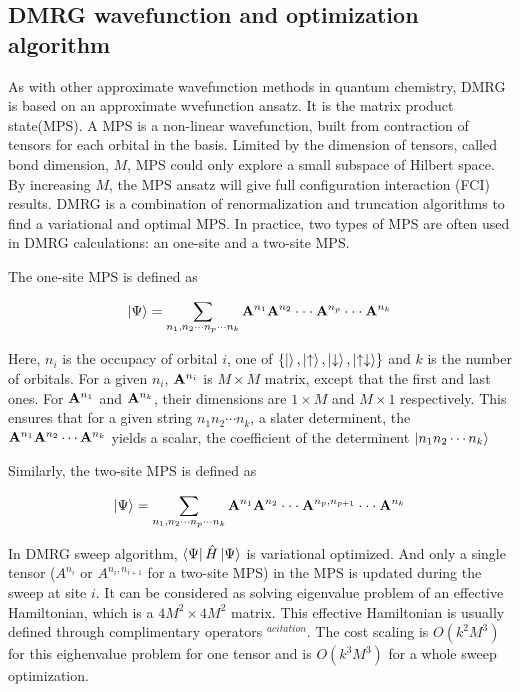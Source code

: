 
\subsection{DMRG wavefunction and optimization algorithm}

As with other approximate wavefunction methods in quantum chemistry, DMRG is based on an approximate wvefunction ansatz. It is the matrix product state(MPS).
A MPS is a non-linear wavefunction, built from contraction of tensors for each orbital in the basis. Limited by the dimension of tensors, called bond dimension, $M$, MPS could only explore a small subspace of Hilbert space. By increasing $M$, the MPS ansatz will give full configuration interaction (FCI) results. DMRG is a combination of renormalization and truncation algorithms to find a variational and optimal MPS. 
In practice, two types of MPS are often used in DMRG calculations: an one-site and a two-site MPS. 

The one-site MPS is defined as

\begin{equation}
  \ket{\Psi}= \sum_{\substack{n_1, n_2\cdot\cdot\cdot n_p\cdot\cdot\cdot n_k}} {\bf A}^{n_1}{\bf A}^{n_2}\cdot\cdot\cdot {\bf A}^{n_{p}} \cdot\cdot\cdot{\bf A}^{n_k}
\end{equation}

Here, $n_i$ is the occupacy of orbital $i$, one of $ \{\ket{}, \ket{\uparrow}, \ket{\downarrow}, \ket{\uparrow\downarrow}\}$ and $k$ is the number of orbitals. 
For a given $n_i$, ${\bf A}^{n_i}$ is $M\times M$ matrix, except that the first and last ones. For ${\bf A}^{n_1}$ and ${\bf A}^{n_k}$, their dimensions are $1\times M$ and $M\times 1$ respectively. 
This ensures that for a given string $n_1n_2\cdots n_k$, a slater determinent, the ${\bf A}^{n_1}{\bf A}^{n_2}\cdots{\bf A}^{n_k}$ yields a scalar, the coefficient of the determinent $\ket{n_1n_2\cdots n_k}$

Similarly, the two-site MPS is defined as

\begin{equation}
  \ket{\Psi}= \sum_{\substack{n_1, n_2\cdot\cdot\cdot n_p\cdot\cdot\cdot n_k}} {\bf A}^{n_1}{\bf A}^{n_2}\cdot\cdot\cdot {\bf A}^{n_{p},n_{p+1}} \cdot\cdot\cdot{\bf A}^{n_k}
\end{equation}

In DMRG sweep algorithm, $\bra{\Psi}\hat{H}\ket{\Psi}$ is variational optimized. And only a single tensor ($A^{n_i}$ or $A^{n_i, n_{i+1}}$ for a two-site MPS) in the MPS is updated during the sweep at site $i$. It can be considered as solving eigenvalue problem of an effective Hamiltonian, which is a $4M^2\times 4M^2$ matrix. This effective Hamiltonian is usually defined through complimentary operators $^{a citation} $. The cost scaling is $O(k^2M^3)$ for this eighenvalue problem for one tensor and is $O(k^3M^3)$ for a whole sweep optimization. 


